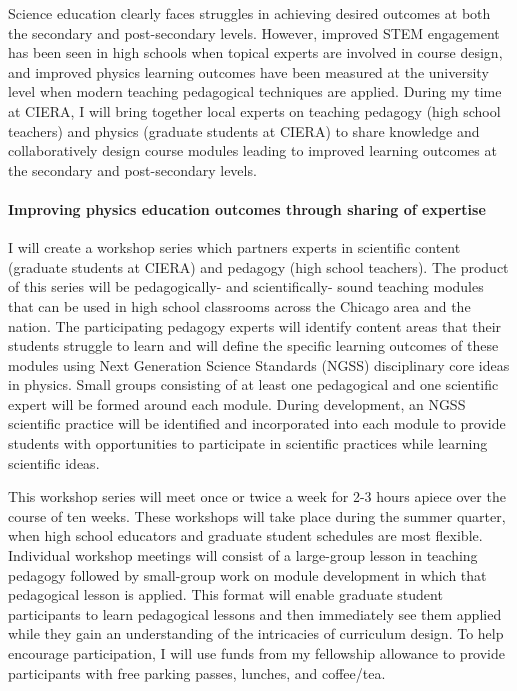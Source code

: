 \documentclass[11pt, preprint]{aastex}
\begin{document}
Science education clearly faces struggles in achieving desired outcomes at both the secondary and post-secondary levels.
However, improved STEM engagement has been seen in high schools when topical experts are involved in course design, and improved physics learning outcomes have been measured at the university level when modern teaching pedagogical techniques are applied.
During my time at CIERA, I will bring together local experts on teaching pedagogy (high school teachers) and physics (graduate students at CIERA) to share knowledge and collaboratively design course modules leading to improved learning outcomes at the secondary and post-secondary levels.

\vspace{-0.5cm}
\paragraph{Improving physics education outcomes through sharing of expertise}
I will create a workshop series which partners experts in scientific content (graduate students at CIERA) and pedagogy (high school teachers).
The product of this series will be pedagogically- and scientifically- sound teaching modules that can be used in high school classrooms across the Chicago area and the nation.
The participating pedagogy experts will identify content areas that their students struggle to learn and will define the specific learning outcomes of these modules using Next Generation Science Standards (NGSS) disciplinary core ideas in physics.
Small groups consisting of at least one pedagogical and one scientific expert will be formed around each module.
During development, an NGSS scientific practice will be identified and incorporated into each module to provide students with opportunities to participate in scientific practices while learning scientific ideas.

This workshop series will meet once or twice a week for 2-3 hours apiece over the course of ten weeks.
These workshops will take place during the summer quarter, when high school educators and graduate student schedules are most flexible.
Individual workshop meetings will consist of a large-group lesson in teaching pedagogy followed by small-group work on module development in which that pedagogical lesson is applied.
This format will enable graduate student participants to learn pedagogical lessons and then immediately see them applied while they gain an understanding of the intricacies of curriculum design.
To help encourage participation, I will use funds from my fellowship allowance to provide participants with free parking passes, lunches, and coffee/tea.
\end{document}
